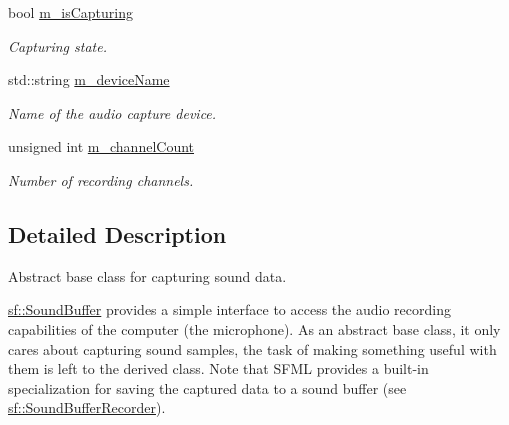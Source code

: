 \begin{DoxyCompactItemize}
bool \mbox{\hyperlink{classsf_1_1_sound_recorder_a245820535f8b81716a374bdd8dc726bb}{m\+\_\+is\+Capturing}}
\begin{DoxyCompactList}\small\item\em Capturing state. \end{DoxyCompactList}\item 
\mbox{\label{classsf_1_1_sound_recorder_a109997f096cf270f6e8516d576b092a1}} 
std\+::string \mbox{\hyperlink{classsf_1_1_sound_recorder_a109997f096cf270f6e8516d576b092a1}{m\+\_\+device\+Name}}
\begin{DoxyCompactList}\small\item\em Name of the audio capture device. \end{DoxyCompactList}\item 
\mbox{\label{classsf_1_1_sound_recorder_a91ceb1464386aa973f2aeeea82ef147c}} 
unsigned int \mbox{\hyperlink{classsf_1_1_sound_recorder_a91ceb1464386aa973f2aeeea82ef147c}{m\+\_\+channel\+Count}}
\begin{DoxyCompactList}\small\item\em Number of recording channels. \end{DoxyCompactList}\end{DoxyCompactItemize}


\subsection{Detailed Description}
Abstract base class for capturing sound data. 

\begin{DoxyVerb}\end{DoxyVerb}


\mbox{\hyperlink{classsf_1_1_sound_buffer}{sf\+::\+Sound\+Buffer}} provides a simple interface to access the audio recording capabilities of the computer (the microphone). As an abstract base class, it only cares about capturing sound samples, the task of making something useful with them is left to the derived class. Note that S\+F\+ML provides a built-\/in specialization for saving the captured data to a sound buffer (see \mbox{\hyperlink{classsf_1_1_sound_buffer_recorder}{sf\+::\+Sound\+Buffer\+Recorder}}).

